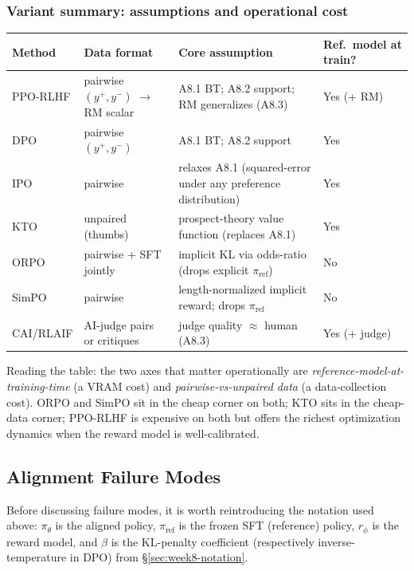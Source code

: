 \subsubsection{Variant summary: assumptions and operational cost}

\begin{center}
\small
\begin{tabular}{|l|p{3.4cm}|p{3.3cm}|p{3.3cm}|}
\hline
\textbf{Method} & \textbf{Data format} & \textbf{Core assumption} & \textbf{Ref.\ model at train?}\\\hline
PPO-RLHF & pairwise $(y^+, y^-)$ $\to$ RM scalar & A8.1 BT; A8.2 support; RM generalizes (A8.3) & Yes (+ RM) \\
DPO & pairwise $(y^+, y^-)$ & A8.1 BT; A8.2 support & Yes \\
IPO \citep{azar2023general} & pairwise & relaxes A8.1 (squared-error under any preference distribution) & Yes \\
KTO \citep{ethayarajh2024kto} & unpaired (thumbs) & prospect-theory value function (replaces A8.1) & Yes \\
ORPO \citep{hong2024orpo} & pairwise + SFT jointly & implicit KL via odds-ratio (drops explicit $\pi_{\mathrm{ref}}$) & No \\
SimPO \citep{meng2024simpo} & pairwise & length-normalized implicit reward; drops $\pi_{\mathrm{ref}}$ & No \\
CAI/RLAIF & AI-judge pairs or critiques & judge quality $\approx$ human (A8.3) & Yes (+ judge) \\
\hline
\end{tabular}
\end{center}

Reading the table: the two axes that matter operationally are
\emph{reference-model-at-training-time} (a VRAM cost) and
\emph{pairwise-vs-unpaired data} (a data-collection cost). ORPO and
SimPO sit in the cheap corner on both; KTO sits in the cheap-data
corner; PPO-RLHF is expensive on both but offers the richest
optimization dynamics when the reward model is well-calibrated.

\subsection{Alignment Failure Modes}

Before discussing failure modes, it is worth reintroducing the
notation used above: $\pi_\theta$ is the aligned policy,
$\pi_{\mathrm{ref}}$ is the frozen SFT (reference) policy, $r_\phi$
is the reward model, and $\beta$ is the KL-penalty coefficient
(respectively inverse-temperature in DPO) from
\S\ref{sec:week8-notation}.


